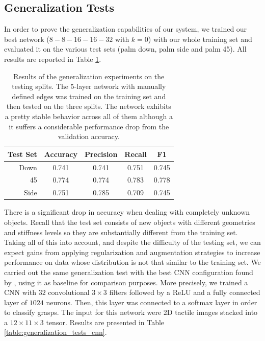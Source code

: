 \subsection{Generalization Tests}

In order to prove the generalization capabilities of our system, we trained our best network ($8-8-16-16-32$ with $k=0$) with our whole training set and evaluated it on the various test sets (palm down, palm side and palm 45). All results are reported in Table \ref{table:generalization_tests}.

\begin{table}[!htb]
  \centering
    \caption{Results of the generalization experiments on the testing splits. The $5$-layer network with manually defined edges was trained on the training set and then tested on the three splits. The network exhibits a pretty stable behavior across all of them although a it suffers a considerable performance drop from the validation accuracy.}
    \label{table:generalization_tests}
    \begin{tabular}{r|cccc}
        \hline
        \textbf{Test Set} & \textbf{Accuracy} & \textbf{Precision} & \textbf{Recall} & \textbf{F1}\\
        \hline
        Down & 0.741 & 0.741 & 0.751 & 0.745\\
        45 & 0.774 & 0.774 & 0.783 & 0.778\\
        Side & 0.751 & 0.785 & 0.709 & 0.745\\
        \hline
    \end{tabular}
\end{table}

There is a significant drop in accuracy when dealing with completely unknown objects. Recall that the test set consists of new objects with different geometries and stiffness levels so they are substantially different from the training set. Taking all of this into account, and despite the difficulty of the testing set, we can expect gains from applying regularization and augmentation strategies to increase performance on data whose distribution is not that similar to the training set. We carried out the same generalization test with the best \ac{CNN} configuration found by \citet{Zapata2018}, using it as baseline for comparison purposes. More precisely, we trained a \ac{CNN} with $32$ convolutional $3\times3$ filters followed by a \ac{ReLU} and a fully connected layer of $1024$ neurons. Then, this layer was connected to a softmax layer in order to classify grasps. The input for this network were \acs{2D} tactile images stacked into a $12\times11\times3$ tensor. Results are presented in Table \ref{table:generalization_tests_cnn}.

